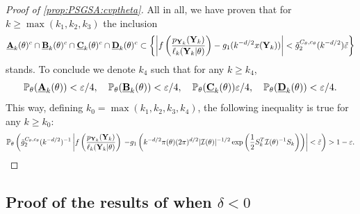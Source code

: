 \begin{proof}[Proof of \cref{prop:PSGSA:cvptheta}]
All in all, we have proven that for $k\geq\max(k_1,k_2,k_3)$ the inclusion
    \begin{equation}
         \underline{\mathbf{A}}_k(\theta)^c\cap \underline{\mathbf{B}}_k(\theta)^c\cap \underline{\mathbf{C}}_k(\theta)^c\cap \underline{\mathbf{D}}_k(\theta)^c \subset \left\{ \left|f\left(\frac{p_{\mathbf{Y}_k}(\mathbf{Y}_k)}{\ell_k(\mathbf{Y}_k|\theta)} \right) - g_1(k^{-d/2} x(\mathbf{Y}_k)) \right| < \tilde g_2^{C_\theta,c_\theta}(k^{-d/2}) \tilde{\varepsilon}  \right\}
    \end{equation}
stands.
To conclude we denote $k_4$ such that for any $k\geq k_4$,
        \begin{equation}
            \mathbb{P}_\theta(\underline{\mathbf{A}}_k(\theta)) <\varepsilon/4,\quad\mathbb{P}_\theta(\underline{\mathbf{B}}_k(\theta))<\varepsilon/4, \quad\mathbb{P}_\theta(\underline{\mathbf{C}}_k(\theta))\varepsilon/4, \quad \mathbb{P}_\theta(\underline{\mathbf{D}}_k(\theta))<\varepsilon/4.
        \end{equation}
This way, defining $k_0=\max(k_1,k_2,k_3,k_4)$, the following inequality is true for any $k\geq k_0$:
\begin{equation}
    \mathbb{P}_\theta\left(\tilde g_2^{C_\theta,c_\theta}(k^{-d/2})^{-1}\left| f\left(\frac{p_{\mathbf{Y}_k}(\mathbf{Y}_k)}{\ell_k(\mathbf{Y}_k|\theta)}\right) \right.            \left. - g_1\left(k^{-d/2}\pi(\theta)(2\pi)^{d/2}|\mathcal{I}(\theta)|^{-1/2}\exp\left(\frac{1}{2}S_k^T\mathcal{I}(\theta)^{-1}S_k \right)\right) \right|<\tilde{\varepsilon}   \right)>1-\varepsilon.
\end{equation}
\end{proof}


\newcommand{\ubf}[1]{\underline{\mbf{#1}}}


\subsection{Proof of the results of when $\delta<0$} %


